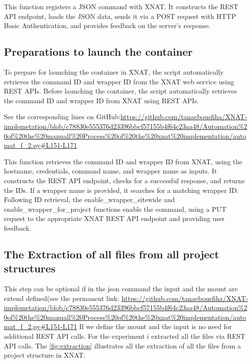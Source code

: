 This function registers a JSON command with XNAT. It constructs the REST API endpoint, loads the JSON data, sends it via a POST request with HTTP Basic Authentication, and provides feedback on the server's response.

\subsection{Preparations to launch the container}

To prepare for launching the container in XNAT, the script automatically retrieves the command ID and wrapper ID from the XNAT web service using REST APIs.
Before launching the container, the script automatically retrieves the command ID and wrapper ID from XNAT using REST APIs.


\noindent\footnotesize See the corresponding lines on GitHub:\url{https://github.com/tanaebousfiha/XNAT-implemetation/blob/c78830e555376d23396bbcf57155b4f64c23aa48/Automation%20of%20the%20manuall%20Process%20of%20the%20xnat%20implementation/automat_f_2.py#L151-L171}
\normalsize


This function retrieves the command ID and wrapper ID from XNAT, using the hostname, credentials, command name, and wrapper name as inputs. It constructs the REST API endpoint, checks for a successful response, and returns the IDs. If a wrapper name is provided, it searches for a matching wrapper ID. Following ID retrieval, the enable\_wrapper\_sitewide and enable\_wrapper\_for\_project functions enable the command, using a PUT request to the appropriate XNAT REST API endpoint and providing user feedback.

\subsection{The Extraction of all files from all project structures}
This step can be optional if in the json command the input and the mount are extend defined(see the permanent link: \url{https://github.com/tanaebousfiha/XNAT-implemetation/blob/c78830e555376d23396bbcf57155b4f64c23aa48/Automation%20of%20the%20manuall%20Process%20of%20the%20xnat%20implementation/automat_f_2.py#L151-L171}
\normalsize
If we define the mount and the input is no need for additional REST API calls.
For the experiment i extracted all the files via REST API calls.
The \autoref{fig:extraction} illustrates all the extraction of all the files from a project structure in XNAT.


